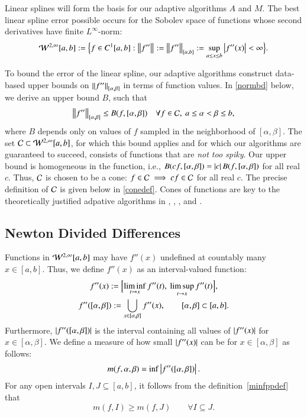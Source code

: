 \documentclass[review]{elsarticle}
\theoremstyle{definition}
\begin{document}
Linear splines will form the basis for our adaptive algorithms $A$ and $M$. The best linear spline error possible occurs for the Sobolev space of functions whose second derivatives have finite $L^{\infty}$-norm:
\[
\cw^{2,\infty}[a,b] : = \Bigl \{f \in C^1[a,b] : \norm{f''} : = \norm[{[a,b]}]{f''} : = \sup_{a \le x \le b} \abs{f''(x)} <  \infty \Bigr\}.
\]

To bound the error of the linear spline, our adaptive algorithms construct data-based upper bounds on $\norm[{[\alpha,
\beta]}]{f''}$ in terms of function values.  In \eqref{normbd} below, we derive an upper bound $B$, such that
\[
\norm[{[\alpha, \beta]}]{f''} \le B(f,[\alpha,\beta]) \quad \forall f \in \cc, \ a \le \alpha < \beta \le b,
\]
where $B$ depends only on values of $f$ sampled in the neighborhood of $[\alpha,
\beta]$. The set $\cc \subset \cw^{2,\infty}[a,b]$, for which this bound applies and for which our algorithms are guaranteed to succeed, consists of functions that are \emph{not too spiky}.  Our upper bound is homogeneous in the function, i.e.,
$B(cf,[\alpha,\beta]) = \abs{c} B(f,[\alpha,\beta])$ for all real $c$. Thus, $\cc$ is chosen to be a cone: $f \in \cc \implies cf \in \cc$ for all real
$c$. The precise definition of $\cc$ is given below in \eqref{conedef}. Cones of
functions are key to the theoretically justified adpative algorithms in
\cite{HicEtal14b}, \cite{Ton14a}, \cite{Din15a}, and \cite{HicRazYun15a}.

\subsection{Newton Divided Differences} \label{sec:ndd}

Functions in $\cw^{2,\infty}[a,b]$ may have $f''(x)$ undefined at countably many $x \in [a,b]$.  Thus, we define $f''(x)$ as an interval-valued function:
\begin{gather*}
f''(x) := \Bigl[\liminf_{t \to x} f''(t), \ \limsup_{t \to x} f''(t) \Bigr], \\
 f''([\alpha, \beta]) := \bigcup_ {x \in [\alpha, \beta]} f''(x), \qquad  [\alpha, \beta] \subset [a,b].
\end{gather*}
Furthermore, $\abs{f''([\alpha, \beta])}$ is the interval containing all values of $\abs{f''(x)}$ for $x \in [\alpha, \beta]$.  We define a
measure of how small $\abs{f''(x)}$ can be for  $x \in [\alpha, \beta]$ as follows:
\begin{equation} \label{minfppdef}
m(f,\alpha, \beta) = \inf \abs{f''([\alpha, \beta])}.
\end{equation}
For any open intervals $I , J \subseteq [a,b]$, it follows from the definition~\eqref{minfppdef}
that
\begin{equation} \label{mdec}
m(f,I) \ge m(f,J) \qquad \forall I \subseteq J.
\end{equation}
\end{document}
